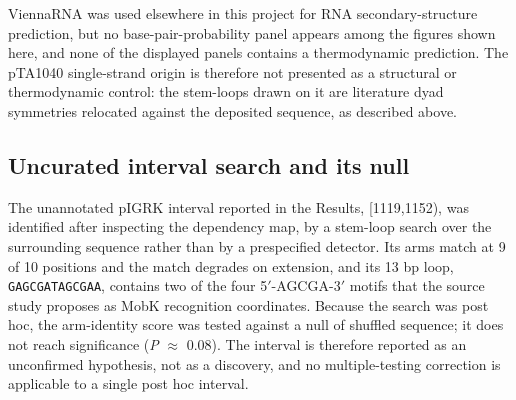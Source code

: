 ViennaRNA \cite{lorenz2011viennarna}
was used elsewhere in this project for RNA secondary-structure prediction,
but no base-pair-probability panel appears among the figures shown here, and
none of the displayed panels contains a thermodynamic prediction. The pTA1040
single-strand origin \cite{meijer1998rolling} is therefore not presented as a
structural or
thermodynamic control: the stem-loops drawn on it are literature dyad
symmetries relocated against the deposited sequence, as described above.

\subsection*{Uncurated interval search and its null}

The unannotated pIGRK interval reported in the Results, [1119,1152), was
identified after inspecting the dependency map, by a stem-loop search over the
surrounding sequence rather than by a prespecified detector. Its arms match at
9 of 10 positions and the match degrades on extension, and its 13 bp loop,
\texttt{GAGCGATAGCGAA}, contains two of the four 5$'$-AGCGA-3$'$ motifs that
the source study proposes as MobK recognition coordinates. Because the search
was post hoc, the arm-identity score was tested against a null of shuffled
sequence; it does not reach significance (\emph{P} $\approx$ 0.08). The
interval is therefore reported as an unconfirmed hypothesis, not as a
discovery, and no multiple-testing correction is applicable to a single post
hoc interval.
